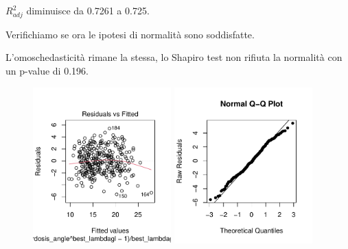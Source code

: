 \documentclass{beamer}
\begin{document}
\begin{frame}
	$R^2_{adj}$ diminuisce da 0.7261 a 0.725.

	Verifichiamo se ora le ipotesi di normalità sono soddisfatte.
\end{frame}

\begin{frame}
	L'omoschedasticità rimane la stessa, lo Shapiro test non rifiuta la normalità con un p-value di 0.196.
	\begin{figure}
	   \includegraphics[width=0.475\textwidth]{10omoschedasticita}
	   \hfill
	   \includegraphics[width=0.475\textwidth]{11qqplot}
	\end{figure}
\end{frame}
\end{document}
